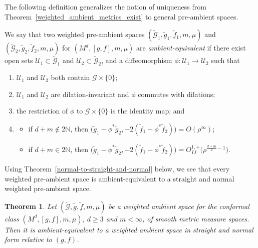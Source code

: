 \documentclass[pdftex]{sigma}
\newcommand{\cg}{\widetilde{g}}
\newcommand{\cf}{\widetilde{f}}
\newcommand{\cmG}{\widetilde{\mathcal{G}}}
\numberwithin{equation}{section}
\newtheorem{Theorem}{Theorem}[section]
\begin{document}
The following definition generalizes the notion of uniqueness from Theorem~\ref{weighted_ambient_metrics_exist} to general pre-ambient spaces.

\begin{Definition}
{\sloppy
We say that two weighted pre-ambient spaces $(\widetilde{\mathcal{G}}_{1}, \widetilde{g}_{1},\widetilde{f}_1,m,\mu)$ and $(\widetilde{\mathcal{G}}_{2}, \widetilde{g}_{2}, \widetilde{f}_2,\allowbreak m,\mu)$ for $(M^d,[g,f],m,\mu)$ are \emph{ambient-equivalent} if there exist open sets $\mathcal{U}_{1} \subset \widetilde{\mathcal{G}}_{1}$ and $\mathcal{U}_{2} \subset \widetilde{\mathcal{G}}_{2}$, and a diffeomorphism $\phi\colon \mathcal{U}_{1} \rightarrow \mathcal{U}_{2}$ such that}
\begin{enumerate}[label=$(\roman*)$]\itemsep=0pt
\item $\mathcal{U}_{1}$ and $\mathcal{U}_{2}$ both contain $\mathcal{G} \times\{0\}$;

\item $\mathcal{U}_{1}$ and $\mathcal{U}_{2}$ are dilation-invariant and $\phi$ commutes with dilations;

\item the restriction of $\phi$ to $\mathcal{G} \times\{0\}$ is the identity map; and

\item \begin{itemize}
\item[$(a)$] if $d+m\notin 2\mathbb{N}$, then $\big(\widetilde{g}_{1}-\phi^{*} \widetilde{g}_{2}, -2(\widetilde{f}_1-\phi^*\widetilde{f}_2)\big)=O(\rho^\infty)$;
\item[$(b)$] if $d+m\in 2\mathbb{N}$, then $\big(\widetilde{g}_{1}-\phi^{*} \widetilde{g}_{2}, -2(\widetilde{f}_1-\phi^*\widetilde{f}_2)\big)=O_{I J}^{1,+}\big(\rho^{\frac{d+m}{2}-1}\big)$.
\end{itemize}
\end{enumerate}
\end{Definition}

Using Theorem~\ref{normal-to-straight-and-normal} below, we see that every weighted pre-ambient space is ambient-equivalent to a straight and normal weighted pre-ambient space.

{\sloppy\begin{Theorem}\label{pullback-normal}
Let $(\cmG,\cg,\cf,m,\mu)$ be a weighted ambient space for the conformal class $(M^d,[g,f],m,\mu)$, $d \geq 3$ and $m<\infty$, of smooth metric measure spaces. Then it is ambient-equivalent to a weighted ambient space in straight and normal form relative to $(g,f)$.
\end{Theorem}}
\end{document}
